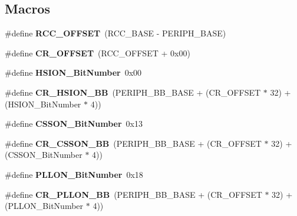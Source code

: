 \subsection*{Macros}
\begin{DoxyCompactItemize}
\item 
\mbox{\label{group___r_c_c_ga539e07c3b3c55f1f1d47231341fb11e1}} 
\#define {\bfseries R\+C\+C\+\_\+\+O\+F\+F\+S\+ET}~(R\+C\+C\+\_\+\+B\+A\+SE -\/ P\+E\+R\+I\+P\+H\+\_\+\+B\+A\+SE)
\item 
\mbox{\label{group___r_c_c_gafa1d3d0ea72132df651c76fc1bdffffc}} 
\#define {\bfseries C\+R\+\_\+\+O\+F\+F\+S\+ET}~(R\+C\+C\+\_\+\+O\+F\+F\+S\+ET + 0x00)
\item 
\mbox{\label{group___r_c_c_ga3d3085e491cbef815d223afbe5bf1930}} 
\#define {\bfseries H\+S\+I\+O\+N\+\_\+\+Bit\+Number}~0x00
\item 
\mbox{\label{group___r_c_c_gac3290a833c0e35ec17d32c2d494e6133}} 
\#define {\bfseries C\+R\+\_\+\+H\+S\+I\+O\+N\+\_\+\+BB}~(P\+E\+R\+I\+P\+H\+\_\+\+B\+B\+\_\+\+B\+A\+SE + (C\+R\+\_\+\+O\+F\+F\+S\+ET $\ast$ 32) + (H\+S\+I\+O\+N\+\_\+\+Bit\+Number $\ast$ 4))
\item 
\mbox{\label{group___r_c_c_ga253fa44d87aabc55f0cd6628e77a51fd}} 
\#define {\bfseries C\+S\+S\+O\+N\+\_\+\+Bit\+Number}~0x13
\item 
\mbox{\label{group___r_c_c_gaca914aed10477ae4090fea0a9639b1ea}} 
\#define {\bfseries C\+R\+\_\+\+C\+S\+S\+O\+N\+\_\+\+BB}~(P\+E\+R\+I\+P\+H\+\_\+\+B\+B\+\_\+\+B\+A\+SE + (C\+R\+\_\+\+O\+F\+F\+S\+ET $\ast$ 32) + (C\+S\+S\+O\+N\+\_\+\+Bit\+Number $\ast$ 4))
\item 
\mbox{\label{group___r_c_c_gab24d7f5f8e4b3b717fd91b54f393f6a3}} 
\#define {\bfseries P\+L\+L\+O\+N\+\_\+\+Bit\+Number}~0x18
\item 
\mbox{\label{group___r_c_c_ga3f1fb2589cb8b5ac2f7121aba1135a5f}} 
\#define {\bfseries C\+R\+\_\+\+P\+L\+L\+O\+N\+\_\+\+BB}~(P\+E\+R\+I\+P\+H\+\_\+\+B\+B\+\_\+\+B\+A\+SE + (C\+R\+\_\+\+O\+F\+F\+S\+ET $\ast$ 32) + (P\+L\+L\+O\+N\+\_\+\+Bit\+Number $\ast$ 4))
\item 

\end{DoxyCompactItemize}
